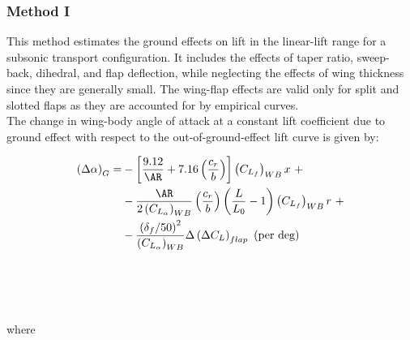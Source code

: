 \subsubsection{Method I}
This method estimates the ground effects on lift in the linear-lift range for a subsonic transport
configuration. It includes the effects of taper ratio, sweep-back, dihedral, and flap deflection, while neglecting the effects of
wing thickness since they are generally small. The wing-flap effects are valid only for split and slotted flaps as they are accounted for by empirical curves. \\
The change in wing-body angle of attack at a constant lift coefficient due to ground effect with
respect to the out-of-ground-effect lift curve is given by:

\begin{equation}
\begin{split}
\left(\Delta \alpha\right)_G=&-\left[\frac{9.12}{\AR}+7.16\left(\frac{c_r}{b}\right)\right]\left( C_{L_f} \right)_{WB}x \ +\\
&-\frac{\AR}{2\left( C_{L_{\alpha}} \right)_{WB}}\left(\frac{c_r}{b}\right)\left(\frac{L}{L_0}-1\right)\left( C_{L_f} \right)_{WB}r \ + \\ &-\frac{\left(\delta_f /50\right)^2}{\left( C_{L_{\alpha}} \right)_{WB}}\Delta \left(\Delta C_L \right)_{flap} \ \text{(per  deg)}
\label{eq:equazione2_1} %
\end{split}
\end{equation}
\\ \\ \\ \\  where\\ \\ \\
